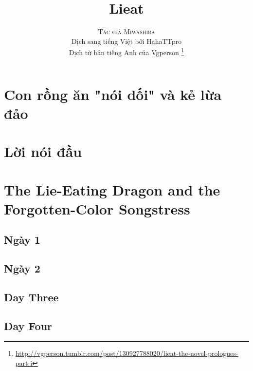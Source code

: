 \documentclass[13pt]{extarticle}
\title{\Huge \textbf{Lieat} \\ }
\author{\textsc{Tác giả Miwashiba} \\ Dịch sang tiếng Việt bởi HahaTTpro \\ Dịch từ bản tiếng Anh của Vgperson \thanks{\url{http://vgperson.tumblr.com/post/130927788020/lieat-the-novel-prologues-part-i}}}
\begin{document}
	
	\maketitle
	
	\pagebreak
		
	\tableofcontents
	
	\pagebreak
	
	\section{Con rồng ăn "nói dối" và kẻ lừa đảo}
	
	
	\section{Lời nói đầu}
	
	
	
	\section{The Lie-Eating Dragon and the Forgotten-Color Songstress}
	
	
	\subsection*{Ngày 1}
	
	
	
	\subsection*{Ngày 2}
	
	
	
	\subsection*{Day Three}
	
	\subsection*{Day Four}
	
\end{document}

